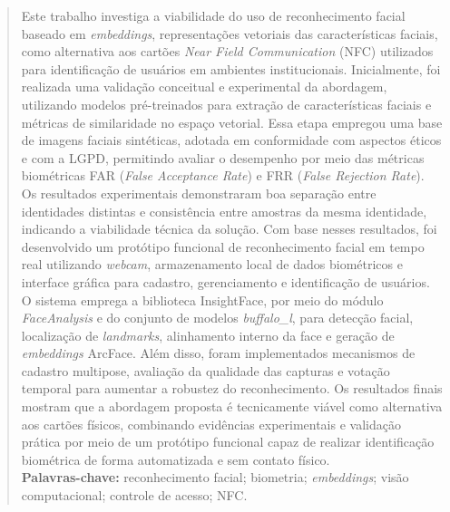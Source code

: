\begin{abstract}
\thispagestyle{empty}
Este trabalho investiga a viabilidade do uso de reconhecimento facial baseado em \textit{embeddings}, representações vetoriais das características faciais, como alternativa aos cartões \textit{Near Field Communication} (\acs{NFC}) utilizados para identificação de usuários em ambientes institucionais. Inicialmente, foi realizada uma validação conceitual e experimental da abordagem, utilizando modelos pré-treinados para extração de características faciais e métricas de similaridade no espaço vetorial. Essa etapa empregou uma base de imagens faciais sintéticas, adotada em conformidade com aspectos éticos e com a \acs{LGPD}, permitindo avaliar o desempenho por meio das métricas biométricas \acs{FAR} (\textit{False Acceptance Rate}) e \acs{FRR} (\textit{False Rejection Rate}). Os resultados experimentais demonstraram boa separação entre identidades distintas e consistência entre amostras da mesma identidade, indicando a viabilidade técnica da solução. Com base nesses resultados, foi desenvolvido um protótipo funcional de reconhecimento facial em tempo real utilizando \textit{webcam}, armazenamento local de dados biométricos e interface gráfica para cadastro, gerenciamento e identificação de usuários. O sistema emprega a biblioteca InsightFace, por meio do módulo \textit{FaceAnalysis} e do conjunto de modelos \textit{buffalo\_l}, para detecção facial, localização de \textit{landmarks}, alinhamento interno da face e geração de \textit{embeddings} ArcFace. Além disso, foram implementados mecanismos de cadastro multipose, avaliação da qualidade das capturas e votação temporal para aumentar a robustez do reconhecimento. Os resultados finais mostram que a abordagem proposta é tecnicamente viável como alternativa aos cartões físicos, combinando evidências experimentais e validação prática por meio de um protótipo funcional capaz de realizar identificação biométrica de forma automatizada e sem contato físico.
\\[0.5em]
\textbf{Palavras-chave:} reconhecimento facial; biometria; \textit{embeddings}; visão computacional; controle de acesso; \acs{NFC}.
\end{abstract}
